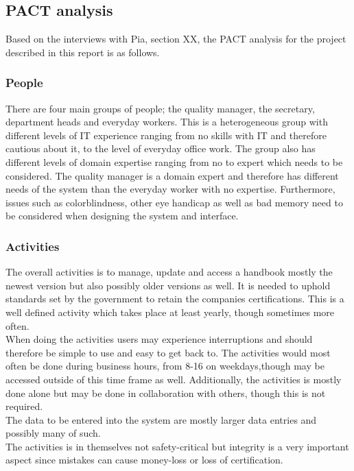 \subsection{PACT analysis}\label{sec:PACT-analysis}
Based on the interviews with Pia,
{\color{red} section XX}, the PACT analysis for the project described in this report is as follows.

\subsubsection*{People}

There are four main groups of people; the quality manager, the secretary, department heads and everyday workers.
This is a heterogeneous group with different levels of IT experience ranging from no skills with IT and therefore cautious about it, to the level of everyday office work.
The group also has different levels of domain expertise ranging from no to expert which needs to be considered. The quality manager is a domain expert and therefore has different needs of the system than the everyday worker with no expertise.
\newline
Furthermore, issues such as colorblindness, other eye handicap as well as bad memory need to be considered when designing the system and interface.

\subsubsection*{Activities}
The overall activities is to manage, update and access a handbook mostly the newest version but also possibly older versions as well.
It is needed to uphold standards set by the government to retain the companies certifications.
This is a well defined activity which takes place at least yearly, though sometimes more often.
\\\indent
When doing the activities users may experience interruptions and should therefore be simple to use and easy to get back to.
The activities would most often be done during business hours, from 8-16 on weekdays,though may be accessed outside of this time frame as well.
Additionally, the activities is mostly done alone but may be done in collaboration with others, though this is not required.
\\\indent
The data to be entered into the system are mostly larger data entries and possibly many of such.
\\\indent
The activities is in themselves not safety-critical but integrity is a very important aspect since mistakes can cause money-loss or loss of certification.

